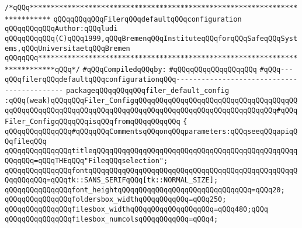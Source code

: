 \label{src/lib/tk/src/toolkit/filer_default_config.pkg}
\verb|/*qQQq***************************************************************************|\newline
\verb|qQQqqQQqqQQqFilerqQQqdefaultqQQqconfiguration|\newline
\verb|qQQqqQQqqQQqAuthor:qQQqludi|\newline
\verb|qQQqqQQqqQQq(C)qQQq1999,qQQqBremenqQQqInstituteqQQqforqQQqSafeqQQqSystems,qQQqUniversitaetqQQqBremen|\newline
\verb|qQQqqQQq**************************************************************************qQQq*/|\newline
\newline
\verb|#qQQqCompiledqQQqby:|\newline
\verb|#qQQqqQQqqQQqqQQqqQQq|\newline
\newline
\verb|#qQQq---qQQqfilerqQQqdefaultqQQqconfigurationqQQq-------------------------------------------|\newline
\newline
\verb|packageqQQqqQQqqQQqfiler_default_config|\newline
\verb|:qQQq(weak)qQQqqQQqFiler_ConfigqQQqqQQqqQQqqQQqqQQqqQQqqQQqqQQqqQQqqQQqqQQqqQQqqQQqqQQqqQQqqQQqqQQqqQQqqQQqqQQqqQQqqQQqqQQqqQQqqQQqqQQq#qQQqFiler_ConfigqQQqqQQqisqQQqfromqQQqqQQqqQQq|\newline
\verb|{|\newline
\verb|qQQqqQQqqQQqqQQq#qQQqqQQqCommentsqQQqonqQQqparameters:qQQqseeqQQqapiqQQqfileqQQq|\newline
\verb|qQQqqQQqqQQqqQQqtitleqQQqqQQqqQQqqQQqqQQqqQQqqQQqqQQqqQQqqQQqqQQqqQQqqQQqqQQq=qQQqTHEqQQq"FileqQQqselection";|\newline
\verb|qQQqqQQqqQQqqQQqfontqQQqqQQqqQQqqQQqqQQqqQQqqQQqqQQqqQQqqQQqqQQqqQQqqQQqqQQqqQQq=qQQqtk::SANS_SERIFqQQq[tk::NORMAL_SIZE];|\newline
\verb|qQQqqQQqqQQqqQQqfont_heightqQQqqQQqqQQqqQQqqQQqqQQqqQQqqQQq=qQQq20;|\newline
\verb|qQQqqQQqqQQqqQQqfoldersbox_widthqQQqqQQqqQQq=qQQq250;|\newline
\verb|qQQqqQQqqQQqqQQqfilesbox_widthqQQqqQQqqQQqqQQqqQQq=qQQq480;qQQq|\newline
\verb|qQQqqQQqqQQqqQQqfilesbox_numcolsqQQqqQQqqQQq=qQQq4;|\newline
